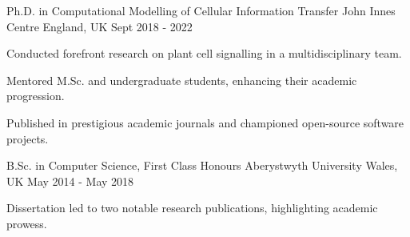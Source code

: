 
\begin{cventries}

  \cventry
    {Ph.D. in Computational Modelling of Cellular Information Transfer} %
    {John Innes Centre} %
    {England, UK} %
    {Sept 2018 - 2022} %
    {
      \begin{cvitems} %
        \item {Conducted forefront research on plant cell signalling in a multidisciplinary team.}
        \item {Mentored M.Sc. and undergraduate students, enhancing their academic progression.}
        \item {Published in prestigious academic journals and championed open-source software projects.}
      \end{cvitems}
    }

  \cventry
    {B.Sc. in Computer Science, First Class Honours} %
    {Aberystwyth University} %
    {Wales, UK} %
    {May 2014 - May 2018} %
    {
      \begin{cvitems} %
        \item {Dissertation led to two notable research publications, highlighting academic prowess.}
      \end{cvitems}
    }

\end{cventries}
